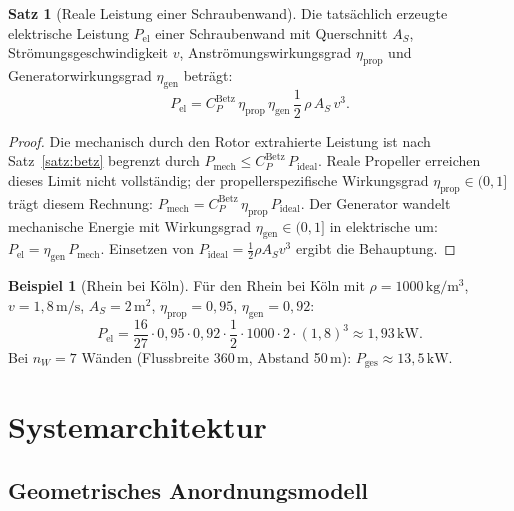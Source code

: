 ﻿\documentclass[a4paper,12pt]{article}
\theoremstyle{definition}
\newtheorem{beispiel}{Beispiel}
\newtheorem{satz}{Satz}
\begin{document}
\begin{satz}[Reale Leistung einer Schraubenwand]
\label{satz:realleistung}
Die tatsächlich erzeugte elektrische Leistung $P_{\mathrm{el}}$ einer Schraubenwand
mit Querschnitt $A_S$, Strömungsgeschwindigkeit $v$, Anströmungswirkungsgrad
$\eta_{\mathrm{prop}}$ und Generatorwirkungsgrad $\eta_{\mathrm{gen}}$ beträgt:
\[
  P_{\mathrm{el}} = C_P^{\mathrm{Betz}}\,\eta_{\mathrm{prop}}\,\eta_{\mathrm{gen}}\,
                    \frac{1}{2}\,\rho\,A_S\,v^3.
\]
\end{satz}

\begin{proof}
Die mechanisch durch den Rotor extrahierte Leistung ist nach Satz~\ref{satz:betz}
begrenzt durch $P_{\mathrm{mech}} \leq C_P^{\mathrm{Betz}}\,P_{\mathrm{ideal}}$.
Reale Propeller erreichen dieses Limit nicht vollständig; der propellerspezifische
Wirkungsgrad $\eta_{\mathrm{prop}} \in (0, 1]$ trägt diesem Rechnung:
$P_{\mathrm{mech}} = C_P^{\mathrm{Betz}}\,\eta_{\mathrm{prop}}\,P_{\mathrm{ideal}}$.
Der Generator wandelt mechanische Energie mit Wirkungsgrad $\eta_{\mathrm{gen}} \in (0, 1]$
in elektrische um: $P_{\mathrm{el}} = \eta_{\mathrm{gen}}\,P_{\mathrm{mech}}$.
Einsetzen von $P_{\mathrm{ideal}} = \frac{1}{2}\rho A_S v^3$ ergibt die Behauptung.
\end{proof}

\begin{beispiel}[Rhein bei Köln]
Für den Rhein bei Köln mit $\rho = 1000\,\mathrm{kg/m^3}$, $v = 1{,}8\,\mathrm{m/s}$,
$A_S = 2\,\mathrm{m^2}$, $\eta_{\mathrm{prop}} = 0{,}95$, $\eta_{\mathrm{gen}} = 0{,}92$:
\[
  P_{\mathrm{el}} = \frac{16}{27} \cdot 0{,}95 \cdot 0{,}92 \cdot \frac{1}{2}
                    \cdot 1000 \cdot 2 \cdot (1{,}8)^3
                  \approx 1{,}93\,\mathrm{kW}.
\]
Bei $n_W = 7$ Wänden (Flussbreite 360\,m, Abstand 50\,m):
$P_{\mathrm{ges}} \approx 13{,}5\,\mathrm{kW}$.
\end{beispiel}

\section{Systemarchitektur}

\subsection{Geometrisches Anordnungsmodell}
\end{document}
